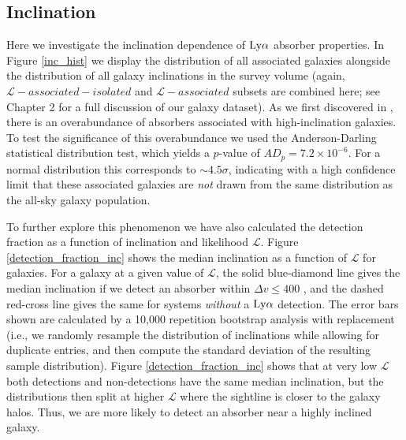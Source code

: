\subsection{Inclination}

Here we investigate the inclination dependence of $\rm Ly\alpha$ absorber properties. In Figure \ref{inc_hist} we display the distribution of all associated galaxies alongside the distribution of all galaxy inclinations in the survey volume (again, $\mathcal{L}-associated-isolated$ and $\mathcal{L}-associated$ subsets are combined here; see Chapter 2 for a full discussion of our galaxy dataset). As we first discovered in \cite{french2017}, there is an overabundance of absorbers associated with high-inclination galaxies. To test the significance of this overabundance we used the Anderson-Darling statistical distribution test, which yields a $p$-value of $AD_p = 7.2 \times 10^{-6}$. For a normal distribution this corresponds to $\sim 4.5 \sigma$, indicating with a high confidence limit that these associated galaxies are \emph{not} drawn from the same distribution as the all-sky galaxy population.


To further explore this phenomenon we have also calculated the detection fraction as a function of inclination and likelihood $\mathcal{L}$. Figure \ref{detection_fraction_inc} shows the median inclination as a function of $\mathcal{L}$ for galaxies. For a galaxy at a given value of $\mathcal{L}$, the solid blue-diamond line gives the median inclination if we detect an absorber within $\Delta v \leq 400$ \kms, and the dashed red-cross line gives the same for systems \emph{without} a $\rm Ly\alpha$ detection. The error bars shown are calculated by a 10,000 repetition bootstrap analysis with replacement (i.e., we randomly resample the distribution of inclinations while allowing for duplicate entries, and then compute the standard deviation of the resulting sample distribution). Figure \ref{detection_fraction_inc} shows that at very low $\mathcal{L}$ both detections and non-detections have the same median inclination, but the distributions then split at higher $\mathcal{L}$ where the sightline is closer to the galaxy halos. Thus, we are more likely to detect an absorber near a highly inclined galaxy. 


